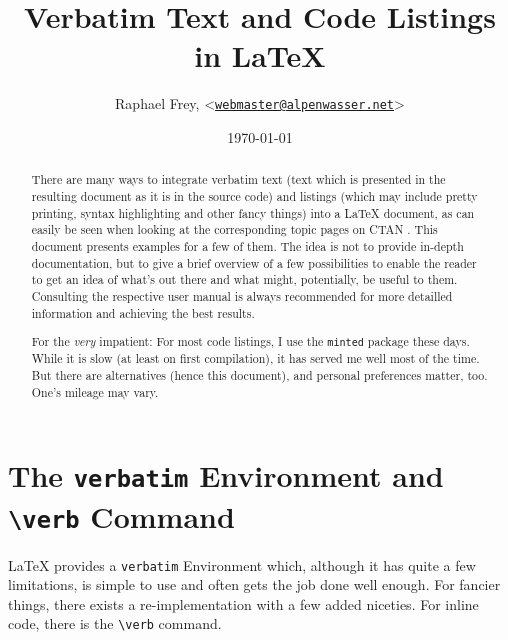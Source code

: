 \documentclass[article,a4paper,oneside,10pt]{memoir}
\title{\textsf{\Huge Verbatim Text and Code Listings in \LaTeX}}
\author{Raphael Frey, <\href{mailto:webmaster@alpenwasser.net}{\nolinkurl{webmaster@alpenwasser.net}}>}
\date{\vspace{1em}\today}
\newcommand\code[1]{\texttt{#1}}
\begin{document}


\maketitle

\begin{abstract}
    There  are   many  ways  to   integrate  verbatim  text  (text   which  is
    presented  in  the  resulting  document  as it  is  in  the  source  code)
    and  listings  (which may  include  pretty  printing, syntax  highlighting
    and  other  fancy  things)  into   a  \LaTeX{}  document,  as  can  easily
    be  seen   when  looking  at   the  corresponding  topic  pages   on  CTAN
    \cite{ctan:topic:listings,ctan:topic:verbatim}. This   document   presents
    examples  for  a  few  of  them. The  idea  is  not  to  provide  in-depth
    documentation, but  to give  a brief  overview of  a few  possibilities to
    enable the  reader to  get an  idea of  what's out  there and  what might,
    potentially, be useful to them.   Consulting the respective user manual is
    always recommended for  more detailled information and  achieving the best
    results.

    For  the  \emph{very}  impatient: For  most   code  listings,  I  use  the
    \code{minted}  package these  days. While it  is slow  (at least  on first
    compilation),  it has  served  me well  most of  the  time. But there  are
    alternatives  (hence  this  document), and  personal  preferences  matter,
    too. One's mileage may vary.
\end{abstract}

\tableofcontents*


\newpage
\chapter{The \code{verbatim} Environment and \code{\textbackslash{}verb} Command}
\label{chap:verbatim}

\LaTeX{} provides a \code{verbatim} Environment which, although it has quite a
few  limitations,  is  simple  to  use  and  often  gets  the  job  done  well
enough. For fancier things, there exists  a re-implementation with a few added
niceties. For inline code, there is the \code{\textbackslash{}verb} command.
\end{document}
